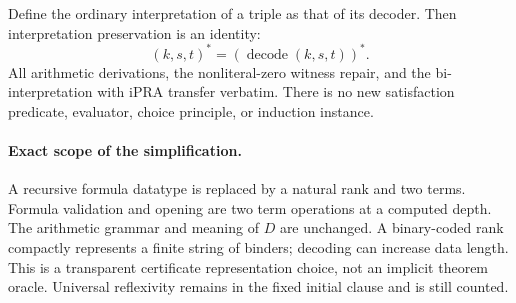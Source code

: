 Define the ordinary interpretation of a triple as that of its decoder.
Then interpretation preservation is an identity:
\[
 (k,s,t)^*=(\operatorname{decode}(k,s,t))^*.
\]
All arithmetic derivations, the nonliteral-zero witness repair, and the
bi-interpretation with iPRA transfer verbatim. There is no new satisfaction
predicate, evaluator, choice principle, or induction instance.

\paragraph{Exact scope of the simplification.}
A recursive formula datatype is replaced by a natural rank and two terms.
Formula validation and opening are two term operations at a computed
depth. The arithmetic grammar and meaning of \(D\) are unchanged.
A binary-coded rank compactly represents a finite string of binders;
decoding can increase data length. This is a transparent certificate
representation choice, not an implicit theorem oracle. Universal
reflexivity remains in the fixed initial clause and is still counted.

